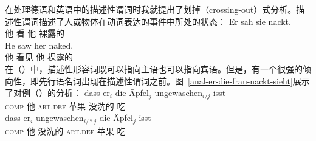 在处理德语和英语中的描述性谓词时我就提出了划掉（crossing-out）式分析\citep{Mueller2004c,Mueller2008a}。描述性谓词描述了人或物体在动词表达的事件中所处的状态：
\eal
\ex 
\gll Er sah sie nackt.\footnotemark\\
	他 看 他 裸露的\\
\ex 
\gll He saw her naked.\\
	他 看见 他 裸露的\\
\zl
在（）中，描述性形容词既可以指向主语也可以指向宾语。但是，有一个很强的倾向性，即先行语名词出现在描述性谓词之前\citep[]{Loetscher85}。图~\vref{anal-er-die-frau-nackt-sieht}展示了对例（）的分析：
\eal
\ex 
\gll dass er$_i$ die Äpfel$_j$ ungewaschen$_{i/j}$ isst\\
	 \textsc{comp} 他 \textsc{art}.\textsc{def} 苹果 没洗的 吃\\
\ex 
\gll dass er$_i$ ungewaschen$_{i/*j}$ die Äpfel$_j$ isst\\
	 \textsc{comp} 他 没洗的 \textsc{art}.\textsc{def} 苹果 吃\\
\zl
